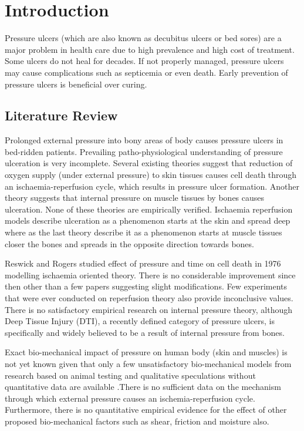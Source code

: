 \chapter{Introduction}
\label{chapter:introduction}

Pressure ulcers (which are also known as decubitus ulcers or bed sores) are a major problem in health care due to high prevalence and high cost of treatment. Some ulcers do not heal for decades. If not properly managed, pressure ulcers may cause complications such as septicemia or even death. Early prevention of pressure ulcers is beneficial over curing. \cite{npuapguide}


\section{Literature Review}
Prolonged external pressure into bony areas of body causes pressure ulcers in bed-ridden patients. Prevailing patho-physiological understanding of pressure ulceration is very incomplete. Several existing theories suggest that reduction of oxygen supply (under external pressure) to skin tissues causes cell death through an ischaemia-reperfusion cycle, which results in pressure ulcer formation. Another theory suggests that internal pressure on muscle tissues by bones causes ulceration. \cite{putheories} None of these theories are empirically verified. Ischaemia reperfusion models describe ulceration as a phenomenon starts at the skin and spread deep where as the last theory describe it as a phenomenon starts at muscle tissues closer the bones and spreads in the opposite direction towards bones. 

Reswick and Rogers studied effect of pressure and time on cell death in 1976 modelling ischaemia oriented theory.\cite{inverserel} There is no considerable improvement since then other than a few papers suggesting slight modifications. Few experiments that were ever conducted on reperfusion theory also provide inconclusive values. There is no satisfactory empirical research on internal pressure theory, although Deep Tissue Injury (DTI), a recently defined category of pressure ulcers, is specifically and widely believed to be a result of internal pressure from bones. \cite{deephypo}


Exact bio-mechanical impact of pressure on human body (skin and muscles) is not yet known given that only a few unsatisfactory bio-mechanical models from research based on animal testing \cite{animalmodels}  and qualitative speculations without quantitative data are available \cite{bloodflow,celldeaththresh,cyclicpressure}.There is no sufficient data on the mechanism through which external pressure causes an ischemia-reperfusion cycle. Furthermore, there is no quantitative empirical evidence for the effect of other proposed bio-mechanical factors such as shear, friction and moisture also. 

